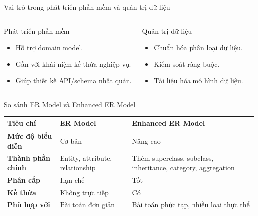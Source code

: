 \documentclass[aspectratio=169,11pt]{beamer}
\begin{document}
\begin{frame}{Vai trò trong phát triển phần mềm và quản trị dữ liệu}
\begin{columns}
\begin{block}{Phát triển phần mềm}
\begin{itemize}
    \item Hỗ trợ domain model.
    \item Gần với khái niệm kế thừa nghiệp vụ.
    \item Giúp thiết kế API/schema nhất quán.
\end{itemize}
\end{block}

\begin{block}{Quản trị dữ liệu}
\begin{itemize}
    \item Chuẩn hóa phân loại dữ liệu.
    \item Kiểm soát ràng buộc.
    \item Tài liệu hóa mô hình dữ liệu.
\end{itemize}
\end{block}
\end{columns}
\end{frame}

\begin{frame}{So sánh ER Model và Enhanced ER Model}
\begin{table}
\centering
\small
\begin{tabularx}{\textwidth}{>{\bfseries}lXX}
\toprule
Tiêu chí & ER Model & Enhanced ER Model \\
\midrule
Mức độ biểu diễn & Cơ bản & Nâng cao \\
Thành phần chính & Entity, attribute, relationship & Thêm superclass, subclass, inheritance, category, aggregation \\
Phân cấp & Hạn chế & Tốt \\
Kế thừa & Không trực tiếp & Có \\
Phù hợp với & Bài toán đơn giản & Bài toán phức tạp, nhiều loại thực thể \\
\bottomrule
\end{tabularx}
\end{table}
\end{frame}
\end{document}
